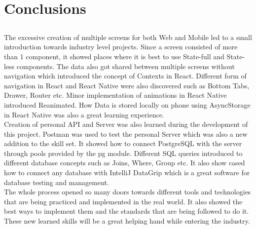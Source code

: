 \chapter{Conclusions}\label{chap:conclusions}

\section*{}
The excessive creation of multiple screens for both Web and Mobile led to a small introduction towards industry level projects. Since a screen consisted of more than 1 component, it showed places where it is best to use State-full and State-less components. The data also got shared between multiple screens without navigation which introduced the concept of Contexts in React. Different form of navigation in React and React Native were also discovered such as Bottom Tabs, Drawer, Router etc. Minor implementation of animations in React Native introduced Reanimated. How Data is stored locally on phone using AsyncStorage in React Native was also a great learning experience. \\
Creation of personal API and Server was also learned during the development of this project. Postman was used to test the personal Server which was also a new addition to the skill set. It showed how to connect PostgreSQL with the server through pools provided by the pg module. Different SQL queries introduced to different database concepts such as Joins, Where, Group etc. It also show cased how to connect any database with IntelliJ DataGrip which is a great software for database testing and management. \\
The whole process opened so many doors towards different tools and technologies that are being practiced and implemented in the real world. It also showed the best ways to implement them and the standards that are being followed to do it. These new learned skills will be a great helping hand while entering the industry.
